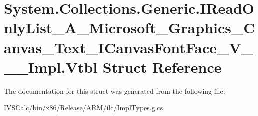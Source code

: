 \hypertarget{struct_system_1_1_collections_1_1_generic_1_1_i_read_only_list___a___microsoft___graphics___canv698389fee19899d62d36c62dfd013890}{}\section{System.\+Collections.\+Generic.\+I\+Read\+Only\+List\+\_\+\+A\+\_\+\+Microsoft\+\_\+\+Graphics\+\_\+\+Canvas\+\_\+\+Text\+\_\+\+I\+Canvas\+Font\+Face\+\_\+\+V\+\_\+\+\_\+\+\_\+\+Impl.\+Vtbl Struct Reference}
\label{struct_system_1_1_collections_1_1_generic_1_1_i_read_only_list___a___microsoft___graphics___canv698389fee19899d62d36c62dfd013890}


The documentation for this struct was generated from the following file\+:\begin{DoxyCompactItemize}
\item 
I\+V\+S\+Calc/bin/x86/\+Release/\+A\+R\+M/ilc/Impl\+Types.\+g.\+cs\end{DoxyCompactItemize}
